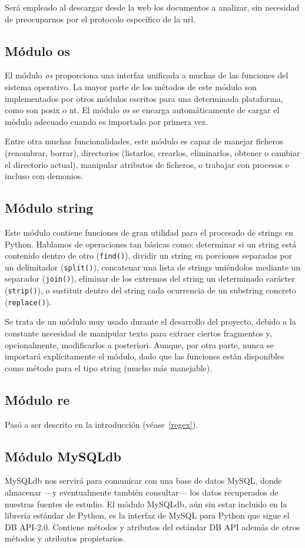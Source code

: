 Será empleado al descargar desde la web los documentos a analizar,
sin necesidad de preocuparnos por el protocolo específico de la url.


\subsection{Módulo os}
El módulo \textit{os} proporciona una interfaz unificada a muchas de las
funciones del sistema operativo. La mayor parte de los métodos de este módulo
son implementados por otros módulos escritos para una determinada plataforma,
como son posix o nt. El módulo \textit{os} se encarga automáticamente de cargar
el módulo adecuado cuando es importado por primera vez.

Entre otra muchas funcionalidades, este módulo es capaz de manejar ficheros
(renombrar, borrar), directorios (listarlos, crearlos, eliminarlos, obtener
o cambiar el directorio actual), manipular atributos de ficheros, o trabajar
con procesos e incluso con demonios.


\subsection{Módulo string}
Este módulo contiene funciones de gran utilidad para el procesado de strings
en Python. Hablamos de operaciones tan básicas como: determinar si un string
está contenido dentro de otro (\texttt{find()}), dividir un string en porciones
separadas por un delimitador (\texttt{split()}), concatenar una lista de
strings uniéndolos mediante un separador (\texttt{join()}), eliminar de los
extremos del string un determinado carácter (\texttt{strip()}), o sustituir
dentro del string cada ocurrencia de un substring concreto (\texttt{replace()}).

Se trata de un módulo muy usado durante el desarrollo del proyecto, debido
a la constante necesidad de manipular texto para extraer ciertos fragmentos y,
opcionalmente, modificarlos a posteriori. Aunque, por otra parte, nunca se
importará explícitamente el módulo, dado que las funciones están disponibles
como método para el tipo string (mucho más manejable).


\subsection{Módulo re}
Pasó a ser descrito en la introducción (véase~\ref{regex}).


\subsection{Módulo MySQLdb} \label{mysqldb}
MySQLdb nos servirá para comunicar con una base de datos MySQL, donde almacenar
---y eventualmente también consultar--- los datos recuperados de nuestras
fuentes de estudio. El módulo MySQLdb, aún sin estar incluido en la librería
estándar de Python,
es la interfaz de MySQL para Python que sigue el DB API-2.0. Contiene
métodos y atributos del estándar DB API además de otros métodos y
atributos propietarios.

